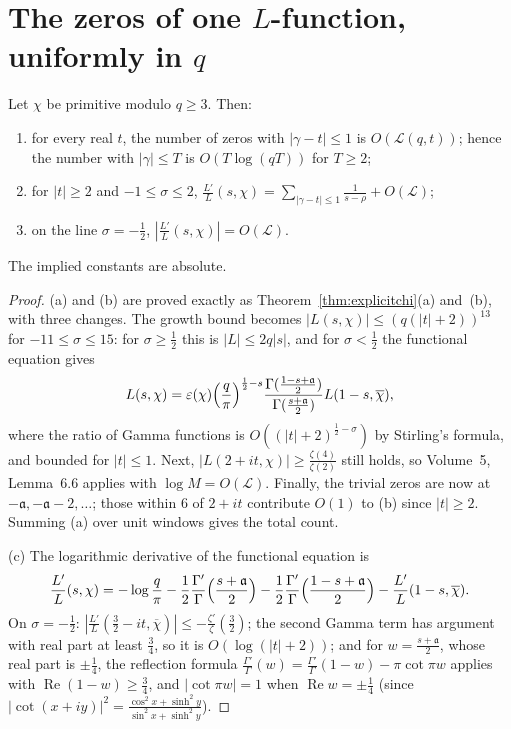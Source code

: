\section{The zeros of one \texorpdfstring{$L$}{L}-function, uniformly in \texorpdfstring{$q$}{q}}

\begin{lemma}\label{lem:localL}
Let $\chi$ be primitive modulo $q\ge3$. Then:
\begin{enumerate}[label=(\alph*)]
\item for every real $t$, the number of zeros with $|\gamma-t|\le1$ is $O(\mathcal L(q,t))$; hence the number with $|\gamma|\le T$ is $O(T\log(qT))$ for $T\ge2$;
\item for $|t|\ge2$ and $-1\le\sigma\le2$, $\frac{L'}L(s,\chi)=\sum_{|\gamma-t|\le1}\frac1{s-\rho}+O(\mathcal L)$;
\item on the line $\sigma=-\frac12$, $|\frac{L'}L(s,\chi)|=O(\mathcal L)$.
\end{enumerate}
The implied constants are absolute.
\end{lemma}
\begin{proof}
(a) and (b) are proved exactly as Theorem~\ref{thm:explicitchi}(a) and~(b), with three changes. The growth bound becomes $|L(s,\chi)|\le(q(|t|+2))^{13}$ for $-11\le\sigma\le15$: for $\sigma\ge\frac12$ this is $|L|\le2q|s|$, and for $\sigma<\frac12$ the functional equation gives
\[
L(s,\chi)=\varepsilon(\chi)\Bigl(\frac q\pi\Bigr)^{\frac12-s}\frac{\Gamma(\frac{1-s+\mathfrak a}2)}{\Gamma(\frac{s+\mathfrak a}2)}L(1-s,\overline\chi),
\]
where the ratio of Gamma functions is $O((|t|+2)^{\frac12-\sigma})$ by Stirling's formula, and bounded for $|t|\le1$. Next, $|L(2+it,\chi)|\ge\frac{\zeta(4)}{\zeta(2)}$ still holds, so Volume~5, Lemma~6.6 applies with $\log M=O(\mathcal L)$. Finally, the trivial zeros are now at $-\mathfrak a,-\mathfrak a-2,\dots$; those within $6$ of $2+it$ contribute $O(1)$ to (b) since $|t|\ge2$. Summing (a) over unit windows gives the total count.

(c) The logarithmic derivative of the functional equation is
\[
\frac{L'}L(s,\chi)=-\log\frac q\pi-\frac12\frac{\Gamma'}\Gamma\Bigl(\frac{s+\mathfrak a}2\Bigr)-\frac12\frac{\Gamma'}\Gamma\Bigl(\frac{1-s+\mathfrak a}2\Bigr)-\frac{L'}L(1-s,\overline\chi).
\]
On $\sigma=-\frac12$: $|\frac{L'}L(\frac32-it,\overline\chi)|\le-\frac{\zeta'}\zeta(\frac32)$; the second Gamma term has argument with real part at least $\frac34$, so it is $O(\log(|t|+2))$; and for $w=\frac{s+\mathfrak a}2$, whose real part is $\pm\frac14$, the reflection formula $\frac{\Gamma'}\Gamma(w)=\frac{\Gamma'}\Gamma(1-w)-\pi\cot\pi w$ applies with $\operatorname{Re}(1-w)\ge\frac34$, and $|\cot\pi w|=1$ when $\operatorname{Re}w=\pm\frac14$ (since $|\cot(x+iy)|^2=\frac{\cos^2x+\sinh^2y}{\sin^2x+\sinh^2y}$).
\end{proof}

